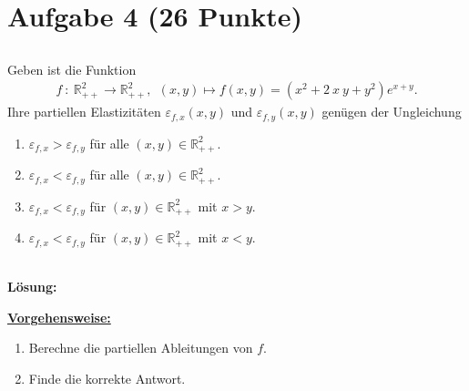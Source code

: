 \section*{Aufgabe 4 (26 Punkte)}
\vspace{0.4cm}
\subsection*{}
Geben ist die Funktion
\begin{align*}
f \ : \ \mathbb{R}^2_{++} \to \mathbb{R}^2_{++},
\ \
(x,y) \mapsto f(x,y) = (x^2 + 2\ x \ y + y^2) e^{x+y}. 
\end{align*}
Ihre partiellen Elastizitäten $ \varepsilon_{f,x}(x,y) $ und
$ \varepsilon_{f,y}(x,y) $ genügen der Ungleichung
\renewcommand{\labelenumi}{(\alph{enumi})}
\begin{enumerate}
	\item 
	$ \varepsilon_{f,x} > \varepsilon_{f,y}  $ für alle $ (x,y) \in \mathbb{R}^2_{++} $.
	\item
	$ \varepsilon_{f,x} < \varepsilon_{f,y}  $ für alle $ (x,y) \in \mathbb{R}^2_{++} $.
	\item
	$ \varepsilon_{f,x} < \varepsilon_{f,y}  $ für $ (x,y) \in \mathbb{R}^2_{++} $ mit $ x > y $.
	\item
	$ \varepsilon_{f,x} < \varepsilon_{f,y}  $ für $ (x,y) \in \mathbb{R}^2_{++} $ mit $ x < y $.
\end{enumerate}
\ \\
\textbf{Lösung:}
\begin{mdframed}
\underline{\textbf{Vorgehensweise:}}
\renewcommand{\labelenumi}{\theenumi.}
\begin{enumerate}
\item Berechne die partiellen Ableitungen von $ f $.
\item Finde die korrekte Antwort.
\end{enumerate}
\end{mdframed}

